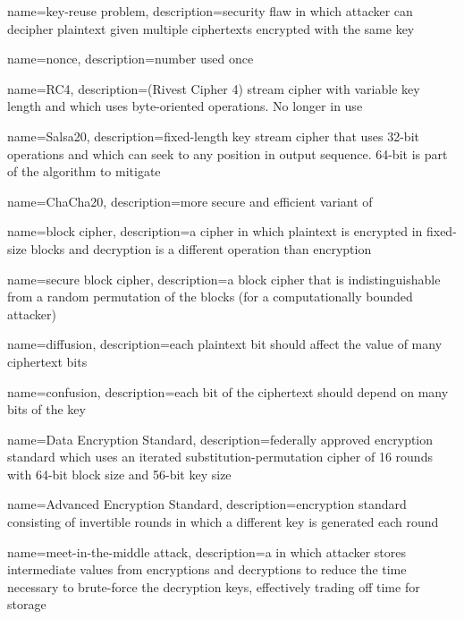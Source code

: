 {
    name={key-reuse problem},
    description={security flaw in which attacker can decipher plaintext given multiple ciphertexts encrypted with the same key}
}

{
    name={nonce},
    description={number used once}
}

{
    name={RC4},
    description={(Rivest Cipher 4) stream cipher with variable key length and which uses byte-oriented operations. No longer in use}
}

{
    name={Salsa20},
    description={fixed-length key stream cipher that uses 32-bit operations and which can seek to any position in output sequence. 64-bit  is part of the algorithm to mitigate }
}

{
    name={ChaCha20},
    description={more secure and efficient variant of }
}

{
    name={block cipher},
    description={a cipher in which plaintext is encrypted in fixed-size blocks and decryption is a different operation than encryption}
}

{
    name={secure block cipher},
    description={a block cipher that is indistinguishable from a random permutation of the blocks (for a computationally bounded attacker)}
}

{
    name={diffusion},
    description={each plaintext bit should affect the value of many ciphertext bits}
}

{
    name={confusion},
    description={each bit of the ciphertext should depend on many bits of the key}
}

{
    name={Data Encryption Standard},
    description={federally approved encryption standard which uses an iterated substitution\nobreakdash-permutation cipher of 16 rounds with 64-bit block size and 56-bit key size}
}

{
    name={Advanced Encryption Standard},
    description={encryption standard consisting of invertible rounds in which a different key is generated each round}
}

{
    name={meet-in-the-middle attack},
    description={a  in which attacker stores intermediate values from encryptions and decryptions to reduce the time necessary to brute-force the decryption keys, effectively trading off time for storage}
}

